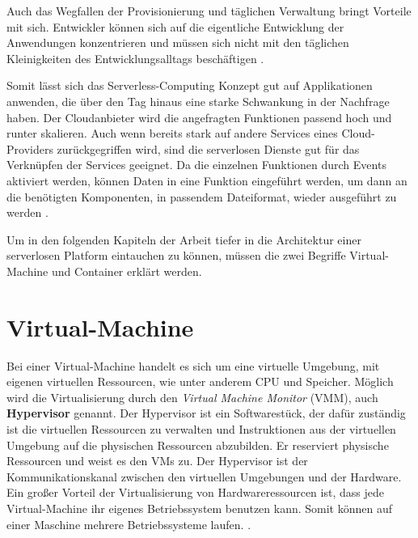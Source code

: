 Auch das Wegfallen der Provisionierung und täglichen Verwaltung bringt Vorteile mit sich.
Entwickler können sich auf die eigentliche Entwicklung der Anwendungen konzentrieren und
müssen sich nicht mit den täglichen Kleinigkeiten des Entwicklungsalltags
beschäftigen \cite{ServerlessTrends}.

Somit lässt sich das Serverless-Computing Konzept gut auf Applikationen anwenden,
die über den Tag hinaus eine starke Schwankung in der Nachfrage haben. Der Cloudanbieter wird
die angefragten Funktionen passend hoch und runter skalieren. Auch wenn bereits stark auf 
andere Services eines Cloud-Providers zurückgegriffen wird, sind die serverlosen Dienste
gut für das Verknüpfen der Services geeignet. Da die einzelnen Funktionen durch Events
aktiviert werden, können Daten in eine Funktion eingeführt werden, um
dann an die benötigten Komponenten, in passendem Dateiformat, wieder ausgeführt zu werden
\cite{ServerlessTrends} \cite{HpcServerless}.

Um in den folgenden Kapiteln der Arbeit tiefer in die Architektur einer serverlosen Platform
eintauchen zu können, müssen die zwei Begriffe Virtual-Machine und Container erklärt werden.

\section{Virtual-Machine}
Bei einer Virtual-Machine handelt es sich um eine virtuelle Umgebung, mit 
eigenen virtuellen Ressourcen, wie unter anderem CPU und Speicher.
Möglich wird die Virtualisierung durch den \textit{Virtual Machine Monitor} (VMM),
auch \textbf{Hypervisor} genannt.
Der Hypervisor ist ein Softwarestück, der dafür zuständig ist die 
virtuellen Ressourcen zu verwalten und Instruktionen aus der virtuellen Umgebung
auf die physischen Ressourcen abzubilden. Er reserviert physische Ressourcen und weist es den VMs zu.
Der Hypervisor ist der Kommunikationskanal zwischen den virtuellen Umgebungen und der Hardware.
Ein großer Vorteil der Virtualisierung von Hardwareressourcen ist,
dass jede Virtual-Machine ihr eigenes Betriebssystem benutzen kann. Somit können auf einer Maschine
mehrere Betriebssysteme laufen.
\cite{RedHatVM} \cite{RedHatHypervisor}.

